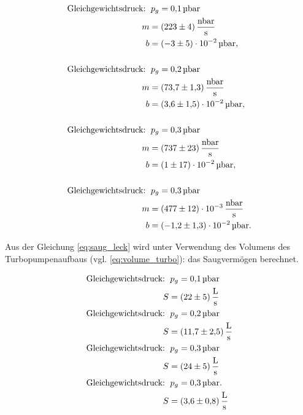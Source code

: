 \begin{align*}
  \text{Gleichgewichtsdruck: } &\, p_g=\SI{0.1}{\micro\bar} \\
  m&= \SI{223\pm 4}{\nano\bar\per\second}\\
  b&=\SI{-3\pm5 e-2}{\micro\bar},\\
  \\
  \text{Gleichgewichtsdruck: } &\, p_g=\SI{0.2}{\micro\bar} \\
  m&= \SI{73.7\pm 1.3 }{\nano\bar\per\second}\\
  b&=\SI{3.6\pm 1.5 e-2}{\micro\bar},\\
  \\
  \text{Gleichgewichtsdruck: } &\, p_g=\SI{0.3}{\micro\bar} \\
  m&= \SI{737\pm 23 }{\nano\bar\per\second}\\
  b&=\SI{1\pm 17 e-2}{\micro\bar},\\
  \\
  \text{Gleichgewichtsdruck: } &\, p_g=\SI{0.3}{\micro\bar} \\
  m&= \SI{477\pm 12 e-3 }{\nano\bar\per\second}\\
  b&=\SI{-1.2\pm 1.3 e-2}{\micro\bar}.\\
\end{align*}

Aus der Gleichung \eqref{eq:saug_leck} wird unter Verwendung des Volumens des Turbopumpenaufbaus (vgl. \eqref{eq:volume_turbo}):
das Saugvermögen berechnet.

\begin{align*}
  \text{Gleichgewichtsdruck: } &\, p_g=\SI{0.1}{\micro\bar} \\
  S&=\SI{22\pm 5}{\litre\per\second}
  \\
  \text{Gleichgewichtsdruck: } &\, p_g=\SI{0.2}{\micro\bar} \\
  S&=\SI{11.7\pm 2.5}{\litre\per\second}
  \\
  \text{Gleichgewichtsdruck: } &\, p_g=\SI{0.3}{\micro\bar} \\
  S&=\SI{24\pm 5}{\litre\per\second}
  \\
  \text{Gleichgewichtsdruck: } &\, p_g=\SI{0.3}{\micro\bar}. \\
  S&=\SI{3.6\pm 00.8}{\litre\per\second}
\end{align*}
